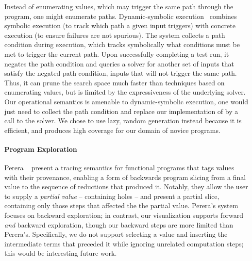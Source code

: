 Instead of enumerating values, which may trigger the same path through
the program, one might enumerate paths. 
%
Dynamic-symbolic execution~\cite{Godefroid2005-am,Cadar2008-kg,Tillmann2008-qc}
%
combines symbolic execution (to track which path a given input
triggers) with concrete execution (to ensure failures are
not spurious). The system collects a path condition during execution,
which tracks symbolically what conditions must be met to trigger the
current path. Upon successfully completing a test run, it negates the
path condition and queries a solver for another set of inputs that
satisfy the negated path condition, \ie inputs that will not trigger the
same path. Thus, it can prune the search space
much faster than techniques based on enumerating values, but is limited
by the expressiveness of the underlying solver. Our operational
semantics is amenable to dynamic-symbolic execution, one would just need
to collect the path condition and replace our implementation of \gensym
by a call to the solver. We chose to use lazy, random generation instead
because it is efficient, and %
produces high coverage for our domain of novice programs.


\paragraph{Program Exploration}
Perera \etal~\cite{Perera2012-dy} present a tracing semantics
for functional programs that tags values with their provenance, enabling
a form of backwards program slicing from a final value to the sequence
of reductions that produced it. Notably, they allow the user to supply a
\emph{partial value} -- containing holes -- and present a partial slice,
containing only those steps that affected the the partial value.
Perera's system focuses on backward exploration; in
contrast, our visualization supports forward \emph{and} backward
exploration, though our backward steps are more limited than
Perera's. Specifically, we do not support selecting a value and
inserting the intermediate terms that preceded it while ignoring
unrelated computation steps; this would be interesting future work.


